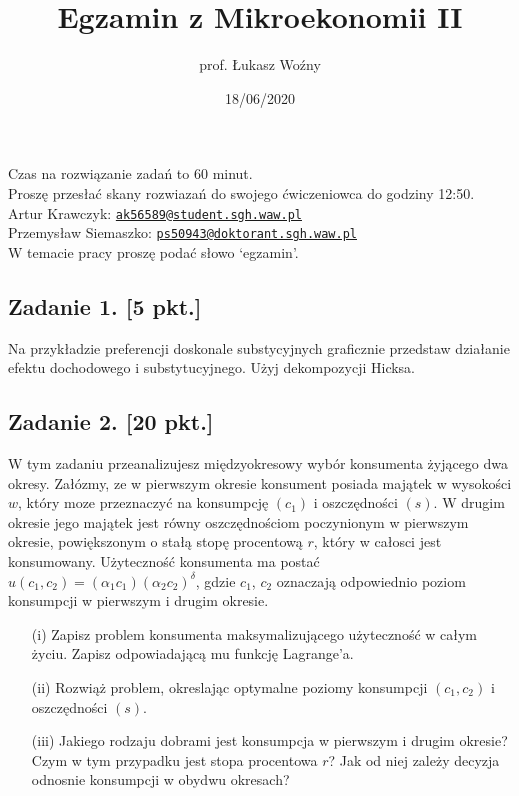 \documentclass[
]{article}
\title{Egzamin z Mikroekonomii II}
\author{prof. Łukasz Woźny}
\date{18/06/2020}
\begin{document}
\maketitle

Czas na rozwiązanie zadań to 60 minut.\\
Proszę przesłać skany rozwiazań do swojego ćwiczeniowca do godziny
12:50.\\
Artur Krawczyk:
\href{mailto:ak56589@student.sgh.waw.pl}{\nolinkurl{ak56589@student.sgh.waw.pl}}\\
Przemysław Siemaszko:
\href{mailto:ps50943@doktorant.sgh.waw.pl}{\nolinkurl{ps50943@doktorant.sgh.waw.pl}}\\
W temacie pracy proszę podać słowo `egzamin'.

\subsection*{Zadanie 1. [5 pkt.]}

Na przykładzie preferencji doskonale substycyjnych graficznie przedstaw
działanie efektu dochodowego i substytucyjnego. Użyj dekompozycji
Hicksa.

\subsection*{Zadanie 2. [20 pkt.]}

W tym zadaniu przeanalizujesz międzyokresowy wybór konsumenta żyjącego
dwa okresy. Załózmy, ze w pierwszym okresie konsument posiada majątek w
wysokości \(w\), który moze przeznaczyć na konsumpcję \((c_1)\) i
oszczędności \((s)\). W drugim okresie jego majątek jest równy
oszczędnościom poczynionym w pierwszym okresie, powiększonym o stałą
stopę procentową \(r\), który w całosci jest konsumowany. Użyteczność
konsumenta ma postać \(u(c_1,c_2)=(\alpha_1c_1)(\alpha_2c_2)^\delta\),
gdzie \(c_1\), \(c_2\) oznaczają odpowiednio poziom konsumpcji w
pierwszym i drugim okresie.

\begin{itemize}
\item[(i)] Zapisz problem konsumenta maksymalizującego użyteczność w całym życiu. Zapisz odpowiadającą mu funkcję Lagrange'a.
\item[(ii)] Rozwiąż problem, okreslając optymalne poziomy konsumpcji $(c_1, c_2)$ i oszczędności $(s)$.
\item[(iii)] Jakiego rodzaju dobrami jest konsumpcja w pierwszym i drugim okresie? Czym w tym przypadku jest stopa procentowa $r$? Jak od niej zależy decyzja odnosnie konsumpcji w obydwu okresach?
\end{itemize}
\end{document}
